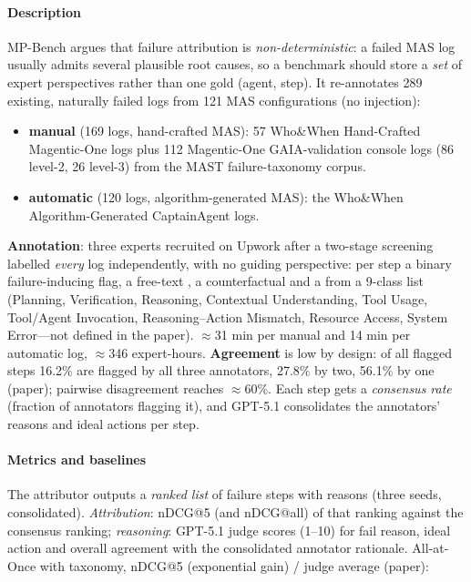 \paragraph{Description} MP-Bench argues that failure attribution is \emph{non-deterministic}: a failed MAS log usually admits several plausible root causes, so a benchmark should store a \emph{set} of expert perspectives rather than one gold (agent, step). It re-annotates 289 existing, naturally failed logs from 121 MAS configurations (no injection):
\begin{itemize}
\item \textbf{manual} (169 logs, hand-crafted MAS): 57 Who\&When Hand-Crafted Magentic-One logs plus 112 Magentic-One GAIA-validation console logs (86 level-2, 26 level-3) from the MAST failure-taxonomy corpus.
\item \textbf{automatic} (120 logs, algorithm-generated MAS): the Who\&When Algorithm-Generated CaptainAgent logs.
\end{itemize}
\textbf{Annotation}: three experts recruited on Upwork after a two-stage screening labelled \emph{every} log independently, with no guiding perspective: per step a binary failure-inducing flag, a free-text , a counterfactual  and a  from a 9-class list (Planning, Verification, Reasoning, Contextual Understanding, Tool Usage, Tool/Agent Invocation, Reasoning--Action Mismatch, Resource Access, System Error---not defined in the paper). $\approx$31 min per manual and 14 min per automatic log, $\approx$346 expert-hours. \textbf{Agreement} is low by design: of all flagged steps 16.2\% are flagged by all three annotators, 27.8\% by two, 56.1\% by one (paper); pairwise disagreement reaches $\approx$60\%. Each step gets a \emph{consensus rate} (fraction of annotators flagging it), and GPT-5.1 consolidates the annotators' reasons and ideal actions per step.

\paragraph{Metrics and baselines} The attributor outputs a \emph{ranked list} of failure steps with reasons (three seeds, consolidated). \emph{Attribution}: nDCG@5 (and nDCG@all) of that ranking against the consensus ranking; \emph{reasoning}: GPT-5.1 judge scores (1--10) for fail reason, ideal action and overall agreement with the consolidated annotator rationale. All-at-Once with taxonomy, nDCG@5 (exponential gain) / judge average (paper):

